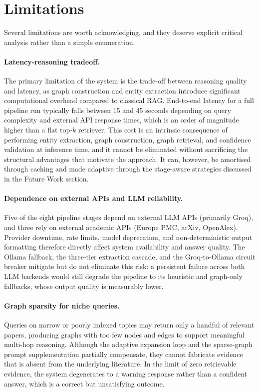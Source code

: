 \documentclass[11pt,a4paper]{article}
\begin{document}
\section{Limitations}

Several limitations are worth acknowledging, and they deserve explicit
critical analysis rather than a simple enumeration.

\paragraph{Latency-reasoning tradeoff.}
The primary limitation of the system is the trade-off between reasoning
quality and latency, as graph construction and entity extraction introduce
significant computational overhead compared to classical RAG. End-to-end
latency for a full pipeline run typically falls between 15 and 45 seconds
depending on query complexity and external API response times, which is an
order of magnitude higher than a flat top-$k$ retriever. This cost is an
intrinsic consequence of performing entity extraction, graph construction,
graph retrieval, and confidence validation at inference time, and it cannot
be eliminated without sacrificing the structural advantages that motivate the
approach. It can, however, be amortised through caching and made adaptive
through the stage-aware strategies discussed in the Future Work section.

\paragraph{Dependence on external APIs and LLM reliability.}
Five of the eight pipeline stages depend on external LLM APIs (primarily
Groq), and three rely on external academic APIs (Europe PMC, arXiv,
OpenAlex). Provider downtime, rate limits, model deprecation, and
non-deterministic output formatting therefore directly affect system
availability and answer quality. The Ollama fallback, the three-tier
extraction cascade, and the Groq-to-Ollama circuit breaker mitigate but do
not eliminate this risk: a persistent failure across both LLM backends would
still degrade the pipeline to its heuristic and graph-only fallbacks, whose
output quality is measurably lower.

\paragraph{Graph sparsity for niche queries.}
Queries on narrow or poorly indexed topics may return only a handful of
relevant papers, producing graphs with too few nodes and edges to support
meaningful multi-hop reasoning. Although the adaptive expansion loop and the
sparse-graph prompt supplementation partially compensate, they cannot
fabricate evidence that is absent from the underlying literature. In the
limit of zero retrievable evidence, the system degenerates to a warning
response rather than a confident answer, which is a correct but unsatisfying
outcome.
\end{document}
